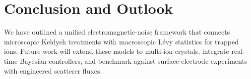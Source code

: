 \section{Conclusion and Outlook}
We have outlined a unified electromagnetic-noise framework that connects microscopic Keldysh treatments with macroscopic L\'evy statistics for trapped ions.
Future work will extend these models to multi-ion crystals, integrate real-time Bayesian controllers, and benchmark against surface-electrode experiments with engineered scatterer fluxes.
